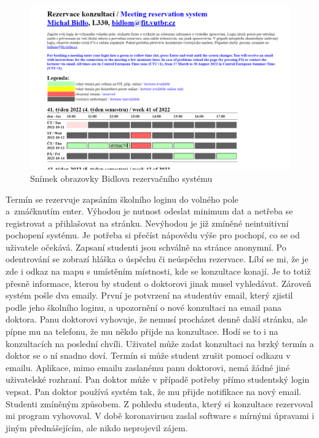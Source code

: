 \begin{figure}[htbp]
    \centering
    \includegraphics[width = \textwidth]{doc/latex/fig/vit/2.png}
    \caption{Snímek obrazovky Bidlova rezervačního systému}
    \label{fig:Vit_k}
\end{figure}

Termín se rezervuje zapsáním školního loginu do volného pole\\ a~zmáčknutím enter.
Výhodou je nutnost odeslat minimum dat a netřeba se registrovat a přihlašovat na stránku. Nevýhodou je již zmíněné neintuitivní pochopení systému. Je potřeba si přečíst nápovědu výše pro pochopí, co se od uživatele očekává. Zapsaní studenti jsou schválně na stránce anonymní. Po odentrování se zobrazí hláška o úspěchu či neúspěchu rezervace. Líbí se mi, že je zde i odkaz na mapu s umístěním místnosti, kde se konzultace konají. Je to totiž přesně informace, kterou by student o doktorovi jinak musel vyhledávat. Zároveň systém pošle dva emaily. První je potvrzení na studentův email, který zjistil podle jeho školního loginu, a upozornění o nové konzultaci na email pana doktora. Panu doktorovi vyhovuje, že nemusí procházet denně další stránku, ale pípne mu na telefonu, že mu někdo přijde na konzultace. Hodí se to i na konzultacích na poslední chvíli. Uživatel může zadat konzultaci na brzký termín a doktor se o ní snadno doví. 
Termín si může student zrušit pomocí odkazu v emailu. Aplikace, mimo emailu zaslanému panu doktorovi, nemá žádné jiné uživatelské rozhraní. Pan doktor může v případě potřeby přímo studentský login vepsat. Pan doktor používá systém tak, že mu přijde notifikace na nový email. Studenti zmíněným způsobem. Z pohledu studenta, který si konzultace rezervoval mi program vyhovoval. V době koronavirusu zaslal software s mírnými úpravami i jiným přednášejícím, ale nikdo neprojevil zájem.

